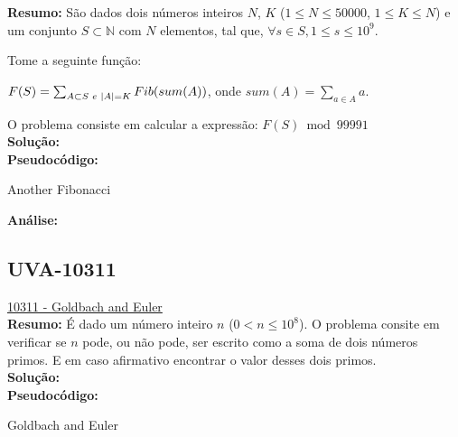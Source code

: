 \textbf{Resumo:}
São dados dois números inteiros $N$, $K$ ($1 \leq N \leq 50000$, $1 \leq K \leq N$) e um conjunto $S \subset \mathbb{N}$ com $N$ elementos, tal que, $\forall s \in S, 1 \leq s \leq 10^9$.

Tome a seguinte função:

$F(S) = \sum_{A \subset S \hspace{1mm} e\hspace{1mm} |A| = K}^{} Fib(sum(A))$, onde $sum(A) = \sum_{a \in A}a$. %

O problema consiste em calcular a expressão:  
$F(S) \bmod 99991 $
\\

\textbf{Solução:}
\\

\textbf{Pseudocódigo:}
\begin{algorithm}
\caption{Another Fibonacci}
\begin{algorithmic}[1]

\EndProcedure
\end{algorithmic}
\end{algorithm}


\textbf{Análise:}







\subsection{UVA-10311}
\href{https://uva.onlinejudge.org/index.php?option=onlinejudge&page=show_problem&problem=1252}{10311 - Goldbach and Euler}\\

\textbf{Resumo:}
É dado um número inteiro $n$ ($0 < n \leq 10^8$). O problema consite em verificar se $n$ pode, ou não pode, ser escrito como a soma de dois números primos. 
E em caso afirmativo encontrar o valor desses dois primos.
\\

\textbf{Solução:}
\\

\textbf{Pseudocódigo:}
\begin{algorithm}
\caption{Goldbach and Euler}
\begin{algorithmic}[1]

\EndProcedure
\end{algorithmic}
\end{algorithm}


